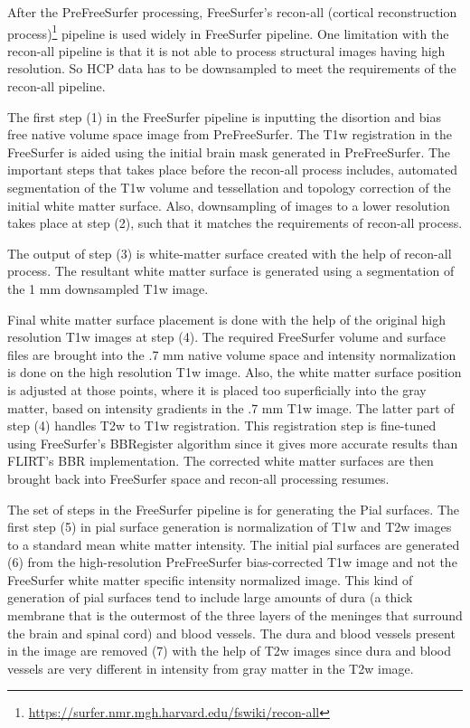 After the PreFreeSurfer processing, FreeSurfer's recon-all (cortical reconstruction process)\footnote{\url{https://surfer.nmr.mgh.harvard.edu/fswiki/recon-all}} pipeline is used widely in FreeSurfer pipeline. One limitation with the recon-all pipeline is that it is not able to process structural images having high resolution. So HCP data has to be downsampled to meet the requirements of the recon-all pipeline.

The first step (1) in the FreeSurfer pipeline is inputting the disortion and bias free native volume space image from PreFreeSurfer. The T1w registration in the FreeSurfer is aided using the initial brain mask generated in PreFreeSurfer. The important steps that takes place before the recon-all process includes, automated segmentation of the T1w volume and tessellation and topology correction of the initial white matter surface. Also, downsampling of images to a lower resolution takes place at step (2), such that it matches the requirements of recon-all process.

The output of step (3) is white-matter surface created with the help of recon-all process. The resultant white matter surface is generated using a segmentation of the 1 mm downsampled T1w image.

Final white matter surface placement is done with the help of the 
original high resolution T1w images at step (4). The required 
FreeSurfer volume and surface files are brought into the .7 mm native 
volume space and intensity normalization is done on the high resolution 
T1w image. Also, the white matter surface position is adjusted at those 
points, where it is placed too superficially into the gray matter, 
based on intensity gradients in the .7 mm T1w image. The latter part of 
step (4) handles T2w to T1w registration. This registration step is 
fine-tuned using FreeSurfer's BBRegister algorithm since it gives more 
accurate results than FLIRT's BBR implementation. The corrected white 
matter surfaces are then brought back into FreeSurfer space and 
recon-all processing resumes. 

The set of steps in the FreeSurfer pipeline is for generating the Pial 
surfaces. The first step (5) in pial surface generation is 
normalization of T1w and T2w images to a standard mean white matter 
intensity. The initial pial surfaces are generated (6) from the 
high-resolution PreFreeSurfer bias-corrected T1w image and not the 
FreeSurfer white matter specific intensity normalized image. This kind 
of generation of pial surfaces tend to include large amounts of dura (a 
thick membrane that is the outermost of the three layers of the 
meninges that surround the brain and spinal cord) and blood vessels. 
The dura and blood vessels present in the image are removed (7) with 
the help of T2w images since dura and blood vessels are very different 
in intensity from gray matter in the T2w image. 

